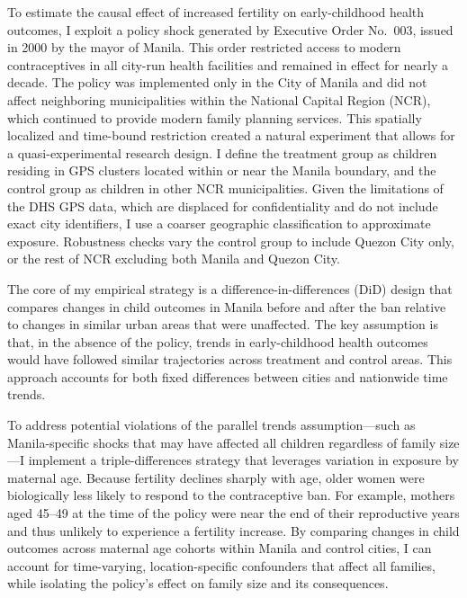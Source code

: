 \documentclass[]{AEA}
\begin{document}
To estimate the causal effect of increased fertility on early-childhood
health outcomes, I exploit a policy shock generated by Executive Order
No.~003, issued in 2000 by the mayor of Manila. This order restricted
access to modern contraceptives in all city-run health facilities and
remained in effect for nearly a decade. The policy was implemented only
in the City of Manila and did not affect neighboring municipalities
within the National Capital Region (NCR), which continued to provide
modern family planning services. This spatially localized and time-bound
restriction created a natural experiment that allows for a
quasi-experimental research design. I define the treatment group as
children residing in GPS clusters located within or near the Manila
boundary, and the control group as children in other NCR municipalities.
Given the limitations of the DHS GPS data, which are displaced for
confidentiality and do not include exact city identifiers, I use a
coarser geographic classification to approximate exposure. Robustness
checks vary the control group to include Quezon City only, or the rest
of NCR excluding both Manila and Quezon City.

The core of my empirical strategy is a difference-in-differences (DiD)
design that compares changes in child outcomes in Manila before and
after the ban relative to changes in similar urban areas that were
unaffected. The key assumption is that, in the absence of the policy,
trends in early-childhood health outcomes would have followed similar
trajectories across treatment and control areas. This approach accounts
for both fixed differences between cities and nationwide time trends.

To address potential violations of the parallel trends assumption---such
as Manila-specific shocks that may have affected all children regardless
of family size---I implement a triple-differences strategy that
leverages variation in exposure by maternal age. Because fertility
declines sharply with age, older women were biologically less likely to
respond to the contraceptive ban. For example, mothers aged 45--49 at
the time of the policy were near the end of their reproductive years and
thus unlikely to experience a fertility increase. By comparing changes
in child outcomes across maternal age cohorts within Manila and control
cities, I can account for time-varying, location-specific confounders
that affect all families, while isolating the policy's effect on family
size and its consequences.
\end{document}
